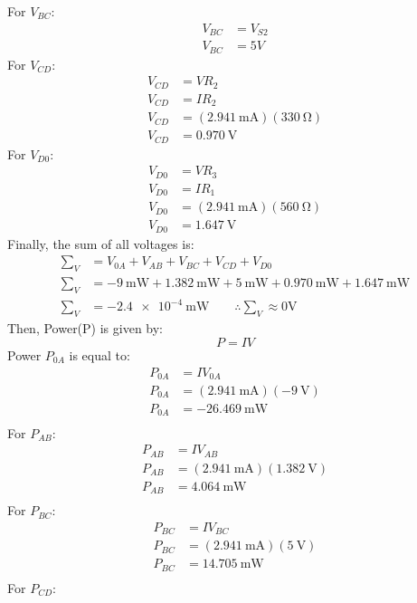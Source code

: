 \documentclass[a4paper]{article}
\begin{document}
For $V_{BC}$:
\begin{align*}
    V_{BC}&=V_{S2}\\
    V_{BC}&=5V
\end{align*}
For $V_{CD}$:
\begin{align*}
    V_{CD}&=VR_2\\
    V_{CD}&=IR_2\\
    V_{CD}&=(\SI{2.941}{\milli\ampere})(\SI{330}{\ohm})\\
    V_{CD}&=\SI{0.970}{\volt}
\end{align*}
For $V_{D0}$:
\begin{align*}
    V_{D0}&=VR_3\\
    V_{D0}&=IR_1\\
    V_{D0}&=(\SI{2.941}{\milli\ampere})(\SI{560}{\ohm})\\
    V_{D0}&=\SI{1.647}{\volt}
\end{align*}
Finally, the sum of all voltages is:
\begin{align*}
    \sum\nolimits_{V}&=V_{0A}+V_{AB}+V_{BC}+V_{CD}+V_{D0}\\
    \sum\nolimits_{V}&=-\SI{9}{\milli\watt}+\SI{1.382}{\milli\watt}+\SI{5}{\milli\watt}+\SI{0.970}{\milli\watt}+\SI{1.647}{\milli\watt}\\
    \sum\nolimits_{V}&=\SI{-2.4e-4}{\milli\watt}\qquad
    \therefore\sum\nolimits_{V}\approx 0\si{\volt}
\end{align*}
Then, Power(P) is given by:
\[P=IV\]
Power $P_{0A}$ is equal to:
\begin{align*}
    P_{0A}&=IV_{0A}\\
    P_{0A}&=(\SI{2.941}{\milli\ampere})(\SI{-9}{\volt})\\
    P_{0A}&=\SI{-26.469}{\milli\watt}\\
\end{align*}
For $P_{AB}$:
\begin{align*}
    P_{AB}&=IV_{AB}\\
    P_{AB}&=(\SI{2.941}{\milli\ampere})(\SI{1.382}{\volt})\\
    P_{AB}&=\SI{4.064}{\milli\watt}\\
\end{align*}
For $P_{BC}$:
\begin{align*}
    P_{BC}&=IV_{BC}\\
    P_{BC}&=(\SI{2.941}{\milli\ampere})(\SI{5}{\volt})\\
    P_{BC}&=\SI{14.705}{\milli\watt}\\
\end{align*}
For $P_{CD}$:
\end{document}
